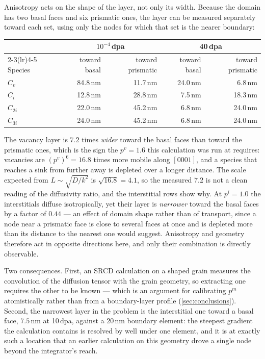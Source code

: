Anisotropy acts on the shape of the layer, not only its width.
Because the domain has two basal faces and six prismatic ones, the layer can be
measured separately toward each set, using only the nodes for which that set is
the nearer boundary:

\begin{center}
\begin{tabular}{@{}lrrrr@{}}
\toprule
& \multicolumn{2}{c}{$10^{-4}$\,dpa} & \multicolumn{2}{c}{40\,dpa} \\
\cmidrule(lr){2-3}\cmidrule(lr){4-5}
Species & toward basal & toward prismatic & toward basal & toward prismatic \\
\midrule
$C_v$    & 84.8\,nm & 11.7\,nm & 24.0\,nm & 6.8\,nm \\
$C_i$    & 12.8\,nm & 28.8\,nm &  7.5\,nm & 18.3\,nm \\
$C_{2i}$ & 22.0\,nm & 45.2\,nm &  6.8\,nm & 24.0\,nm \\
$C_{3i}$ & 24.0\,nm & 45.2\,nm &  6.8\,nm & 24.0\,nm \\
\bottomrule
\end{tabular}
\end{center}

The vacancy layer is $7.2$ times \emph{wider} toward the basal faces than toward
the prismatic ones, which is the sign the $p^{v}=1.6$ this calculation was run at
requires: vacancies are $(p^{v})^{6}=16.8$ times more mobile along $[0001]$, and a species
that reaches a sink from further away is depleted over a longer distance. The
scale expected from $L\sim\sqrt{D/k^{2}}$ is
$\sqrt{16.8}=4.1$, so the measured $7.2$ is not a clean reading of the
diffusivity ratio, and the interstitial rows show why. At $p^{i}=1.0$ the
interstitials diffuse isotropically, yet their layer is \emph{narrower} toward
the basal faces by a factor of $0.44$ --- an effect of domain shape rather than
of transport, since a node near a prismatic face is close to several faces at
once and is depleted more than its distance to the nearest one would suggest.
Anisotropy and geometry therefore act in opposite directions here, and only
their combination is directly observable.

Two consequences. First, an SRCD calculation on a shaped grain measures the
convolution of the diffusion tensor with the grain geometry, so extracting one
requires the other to be known --- which is an argument for calibrating $p^{m}$
atomistically rather than from a boundary-layer profile
(\cref{sec:conclusions}). Second, the narrowest layer in the problem is the
interstitial one toward a basal face, $7.5\,$nm at 10\,dpa, against a
$20\,$nm boundary element: the steepest gradient the calculation contains is
resolved by well under one element, and it is at exactly such a location that an
earlier calculation on this geometry drove a single node beyond the integrator's
reach.

